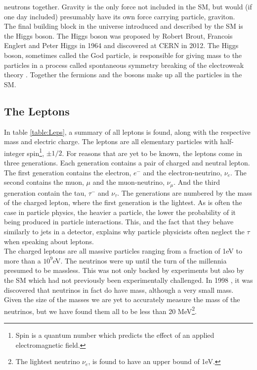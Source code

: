neutrons together. Gravity is the only force not included in the SM, but would (if one day included)
presumably have its own force carrying particle, graviton. 
\\
The final building block in the universe introduced and described by the \ac{SM} is the Higgs boson.
The Higgs boson was proposed by Robert Brout, Francois Englert and Peter Higgs in 1964 and discovered at CERN in 2012. The Higgs boson,
sometimes called the God particle, is responsible for giving mass to the particles in a process called
spontaneous symmetry breaking of the electroweak theory \cite{SSB}. Together the fermions and the bosons make up all the 
particles in the \ac{SM}.
\subsection{The Leptons} 
In table \ref{table:Leps}, a summary of all leptons is found, along with the respective mass and electric charge.  
The leptons are all elementary particles with half-integer spin\footnote{Spin is a quantum number
which predicts the effect of an applied electromagnetic field.}, $\pm 1/2$. For reasons that are yet to be known, the 
leptons come in three generations. Each generation contains a pair of charged and neutral lepton. The first generation contains the
electron, $e^-$ and the electron-neutrino, $\nu_e$. The second contains the muon, $\mu$ and the
muon-neutrino, $\nu_\mu$. And the third generation contain the tau, $\tau^-$ and $\nu_\tau$. The generations
are numbered by the mass of the charged lepton, where the first generation is the lightest. As is often the case
in particle physics, the heavier a particle, the lower the probability of it being produced in particle interactions. 
This, and the fact that they behave similarly to jets in a detector, explains why particle physicists often neglect 
the $\tau$ when speaking about leptons.
\\
The charged leptons are all massive particles ranging from a fraction of 1eV to more than a $10^9$eV.
The neutrinos were up until the turn of the millennia presumed to be massless. This was not only backed by experiments
but also by the \ac{SM} which had not previously been experimentally challenged. In 1998 \cite{NeutrinoMass}, it was discovered 
that neutrinos in fact do have mass, although a very small mass. Given the size of the masses we are yet to accurately measure 
the mass of the neutrinos, but we have found them all to be less than 20 MeV\footnote{The lightest neutrino $\nu_e$, is found to 
have an upper bound of 1eV.}.

